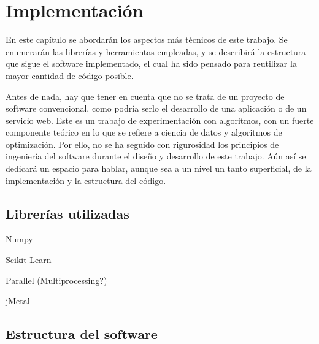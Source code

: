 \chapter{Implementación}\label{ch:impl}

En este capítulo se abordarán los aspectos más técnicos de este trabajo. Se enumerarán las librerías y herramientas empleadas, y se describirá la estructura que sigue el software implementado, el cual ha sido pensado para reutilizar la mayor cantidad de código posible.

Antes de nada, hay que tener en cuenta que no se trata de un proyecto de software convencional, como podría serlo el desarrollo de una aplicación o de un servicio web. Este es un trabajo de experimentación con algoritmos, con un fuerte componente teórico en lo que se refiere a ciencia de datos y algoritmos de optimización. Por ello, no se ha seguido con rigurosidad los principios de ingeniería del software durante el diseño y desarrollo de este trabajo. Aún así se dedicará un espacio para hablar, aunque sea a un nivel un tanto superficial, de la implementación y la estructura del código.

\section{Librerías utilizadas}

Numpy

Scikit-Learn

Parallel (Multiprocessing?)

jMetal

\section{Estructura del software}



